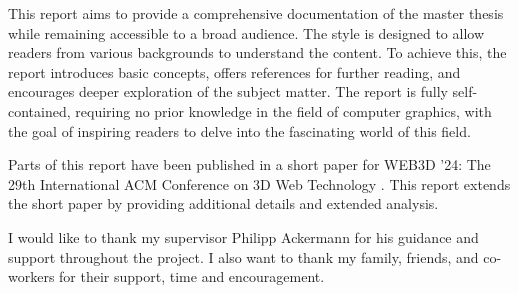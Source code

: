 
This report aims to provide a comprehensive documentation of the master thesis while remaining accessible to a broad audience. The style is designed to allow readers from various backgrounds to understand the content. To achieve this, the report introduces basic concepts, offers references for further reading, and encourages deeper exploration of the subject matter. The report is fully self-contained, requiring no prior knowledge in the field of computer graphics, with the goal of inspiring readers to delve into the fascinating world of this field.

Parts of this report have been published in a short paper for WEB3D '24: The 29th International ACM Conference on 3D Web Technology \cite{ownShortPaper}. This report extends the short paper by providing additional details and extended analysis.

I would like to thank my supervisor Philipp Ackermann for his guidance and support throughout the project. I also want to thank my family, friends, and co-workers for their support, time and encouragement.
